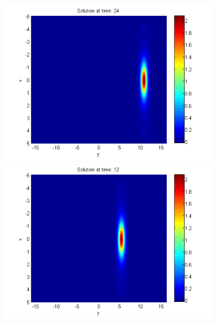 \documentclass[a4paper]{article}
\theoremstyle{remark}
\begin{document}
\begin{large}
\begin{figure}[ht]
\begin{minipage}[b]{0.48\linewidth}
		\includegraphics[width=\linewidth]{../amitans/figures/solution_30x45_bt3_c045_T24.png}
	\end{minipage}	
	\begin{minipage}[b]{0.48\linewidth}
		\raggedleft
		\includegraphics[width=\linewidth]{../amitans/figures/solution_30x45_bt3_c045_T12.png}
	\end{minipage}
	\begin{minipage}[b]{0.48\linewidth}
		\raggedright

\end{minipage}
\end{figure}
\end{large}
\end{document}
